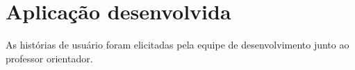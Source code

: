\section{Aplicação desenvolvida}

As histórias de usuário foram elicitadas pela equipe de desenvolvimento junto ao professor orientador.

